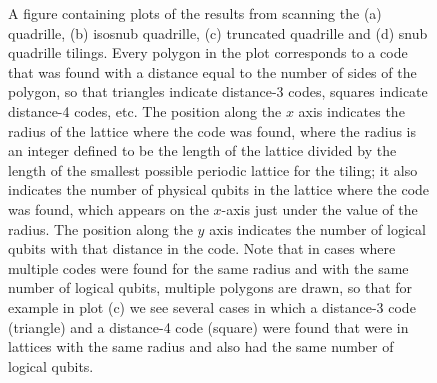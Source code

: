 \documentclass[twocolumn,showpacs,preprintnumbers,amsmath,amssymb,nofootinbib,pra,floatfix]{revtex4-1}
\begin{document}
\begin{figure}
\caption{
\label{figure:results-quadrille}
A figure containing plots of the results from scanning the (a) quadrille, (b) isosnub quadrille, (c) truncated quadrille and (d) snub quadrille tilings.  Every polygon in the plot corresponds to a code that was found with a distance equal to the number of sides of the polygon, so that triangles indicate distance-3 codes, squares indicate distance-4 codes, etc.  The position along the $x$ axis indicates the radius of the lattice where the code was found, where the radius is an integer defined to be the length of the lattice divided by the length of the smallest possible periodic lattice for the tiling;  it also indicates the number of physical qubits in the lattice where the code was found, which appears on the $x$-axis just under the value of the radius.  The position along the $y$ axis indicates the number of logical qubits with that distance in the code.
Note that in cases where multiple codes were found for the same radius and with the same number of logical qubits, multiple polygons are drawn, so that for example in plot (c) we see several cases in which a distance-3 code (triangle) and a distance-4 code (square) were found that were in lattices with the same radius and also had the same number of logical qubits.
}
\end{figure}
\end{document}
